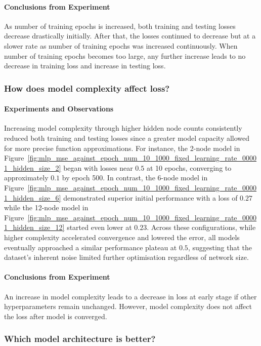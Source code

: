 \documentclass{article}
\begin{document}
\paragraph{Conclusions from Experiment}
As number of training epochs is increased, both training and testing losses decrease drastically initially. After that, the losses continued to decrease but at a slower rate as number of training epochs was increased continuously. When number of training epochs becomes too large, any further increase leads to no decrease in training loss and increase in testing loss. 


\subsubsection{How does model complexity affect loss? }
\paragraph{Experiments and Observations}
Increasing model complexity through higher hidden node counts consistently reduced both training and testing losses since a greater model capacity allowed for more precise function approximations. For instance, the 2-node model in Figure~\ref{fig:mlp_mse_against_epoch_num_10_1000_fixed_learning_rate_00001_hidden_size_2} began with losses near $0.5$ at 10 epochs, converging to approximately $0.1$ by epoch 500. In contrast, the 6-node model in Figure~\ref{fig:mlp_mse_against_epoch_num_10_1000_fixed_learning_rate_00001_hidden_size_6} demonstrated superior initial performance with a loss of $0.27$ while the 12-node model in Figure~\ref{fig:mlp_mse_against_epoch_num_10_1000_fixed_learning_rate_00001_hidden_size_12} started even lower at $0.23$. Across these configurations, while higher complexity accelerated convergence and lowered the error, all models eventually approached a similar performance plateau at $0.5$, suggesting that the dataset's inherent noise limited further optimisation regardless of network size. 

\paragraph{Conclusions from Experiment}
An increase in model complexity leads to a decrease in loss at early stage if other hyperparameters remain unchanged. However, model complexity does not affect the loss after model is converged. 


\subsubsection{Which model architecture is better? }
\end{document}
